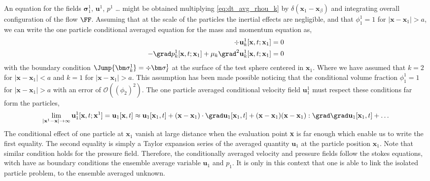 An equation for the fields $\bm\sigma^1_1$, $\textbf{u}^1$, $p^1$ \ldots 
might be obtained multiplying \ref{eq:dt_avg_rhou_k} by $\delta(\textbf{x}_1 - \textbf{x}_\beta)$ and integrating overall configuration of the flow $\FF$. 
Assuming that at the scale of the particles the inertial effects are negligible, and that $\phi_1^1 = 1$ for $|\textbf{x}-\textbf{x}_1|>a$, we can write the one particle conditional averaged equation for the mass and momentum equation as, 
\begin{align}
    \div \textbf{u}^1_k[\textbf{x},t;\textbf{x}_1]=0\\
    -\grad p_k^1[\textbf{x},t;\textbf{x}_1] 
    + \mu_k \grad^2 \textbf{u}_k^1[\textbf{x},t;\textbf{x}_1]
    = 0
\end{align}
with the boundary condition $\Jump{\bm\sigma^1_k} = \div \bm\sigma_I^1$ at the surface of the test sphere centered in $\textbf{x}_1$.
Where we have assumed that $k=2$ for $|\textbf{x}-\textbf{x}_1|<a$ and $k=1$ for $|\textbf{x}-\textbf{x}_1|>a$.
This assumption has been made possible noticing that the conditional volume fraction $\phi_1^1 = 1$ for $|\textbf{x}-\textbf{x}_1|>a$ with an error of $\mathcal{O}((\phi_2)^2)$. 
The one particle averaged conditional velocity field $\textbf{u}_1^1$ must respect these conditions far form the particles, 
\begin{equation*}
    \lim_{|\textbf{x}^1 - \textbf{x}| \to \infty} \textbf{u}_1^1[\textbf{x},t;\textbf{x}^1] = \textbf{u}_1[\textbf{x},t]
    \approx \textbf{u}_1[\textbf{x}_1,t] + (\textbf{x} - \textbf{x}_1)\cdot \grad \textbf{u}_1[\textbf{x}_1,t] + (\textbf{x} - \textbf{x}_1)(\textbf{x} - \textbf{x}_1): \grad\grad \textbf{u}_1[\textbf{x}_1,t] + \ldots 
\end{equation*}
The conditional effect of one particle at $\textbf{x}_1$ vanish at large distance when the evaluation point \textbf{x} is far enough which enable us to write the first equality. 
The second equality is simply a Taylor expansion series of the averaged quantity $\textbf{u}_1$ at the particle position $\textbf{x}_1$.  
Note that similar condition holds for the pressure field. 
Therefore, the conditionally averaged velocity and pressure fields follow the stokes equations, witch have as boundary conditions the ensemble average variable $\textbf{u}_1$ and $p_1$. 
It is only in this context that one is able to link the isolated particle problem, to the ensemble averaged unknown.
 

